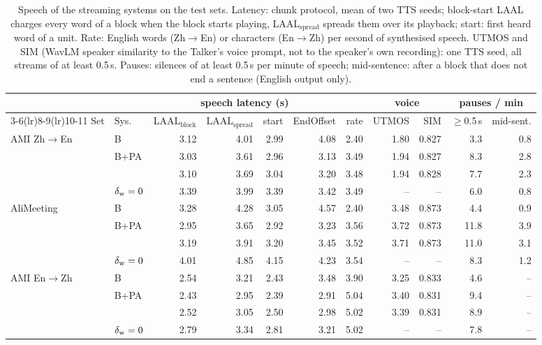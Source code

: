 \begin{table}[t]
\centering\small
\setlength{\tabcolsep}{3.5pt}
\begin{tabular}{llrrrrrrrrr}
\toprule
 & & \multicolumn{4}{c}{speech latency (s)} & & \multicolumn{2}{c}{voice} & \multicolumn{2}{c}{pauses / min} \\
\cmidrule(lr){3-6}\cmidrule(lr){8-9}\cmidrule(lr){10-11}
Set & Sys. & LAAL$_\text{block}$ & LAAL$_\text{spread}$ & start & EndOffset & rate & UTMOS & SIM & $\ge$0.5\,s & mid-sent. \\
\midrule
AMI Zh$\rightarrow$En & B & 3.12 & 4.01 & 2.99 & 4.08 & 2.40 & 1.80 & 0.827 & 3.3 & 0.8 \\
 & B+PA & 3.03 & 3.61 & 2.96 & 3.13 & 3.49 & 1.94 & 0.827 & 8.3 & 2.8 \\
 & \sys{} & 3.10 & 3.69 & 3.04 & 3.20 & 3.48 & 1.94 & 0.828 & 7.7 & 2.3 \\
 & $\delta_{\mathrm{w}}=0$ & 3.39 & 3.99 & 3.39 & 3.42 & 3.49 & -- & -- & 6.0 & 0.8 \\
\midrule
AliMeeting & B & 3.28 & 4.28 & 3.05 & 4.57 & 2.40 & 3.48 & 0.873 & 4.4 & 0.9 \\
 & B+PA & 2.95 & 3.65 & 2.92 & 3.23 & 3.56 & 3.72 & 0.873 & 11.8 & 3.9 \\
 & \sys{} & 3.19 & 3.91 & 3.20 & 3.45 & 3.52 & 3.71 & 0.873 & 11.0 & 3.1 \\
 & $\delta_{\mathrm{w}}=0$ & 4.01 & 4.85 & 4.15 & 4.23 & 3.54 & -- & -- & 8.3 & 1.2 \\
\midrule
AMI En$\rightarrow$Zh & B & 2.54 & 3.21 & 2.43 & 3.48 & 3.90 & 3.25 & 0.833 & 4.6 & -- \\
 & B+PA & 2.43 & 2.95 & 2.39 & 2.91 & 5.04 & 3.40 & 0.831 & 9.4 & -- \\
 & \sys{} & 2.52 & 3.05 & 2.50 & 2.98 & 5.02 & 3.39 & 0.831 & 8.9 & -- \\
 & $\delta_{\mathrm{w}}=0$ & 2.79 & 3.34 & 2.81 & 3.21 & 5.02 & -- & -- & 7.8 & -- \\
\bottomrule
\end{tabular}
\caption{Speech of the streaming systems on the test sets. Latency: chunk protocol, mean of two TTS seeds; block-start LAAL charges every word of a block when the block starts playing, LAAL$_\text{spread}$ spreads them over its playback; start: first heard word of a unit. Rate: English words (Zh$\rightarrow$En) or characters (En$\rightarrow$Zh) per second of synthesised speech. UTMOS and SIM (WavLM speaker similarity to the Talker's voice prompt, not to the speaker's own recording): one TTS seed, all streams of at least 0.5\,s. Pauses: silences of at least 0.5\,s per minute of speech; mid-sentence: after a block that does not end a sentence (English output only).}
\label{tab:postreview}
\end{table}

